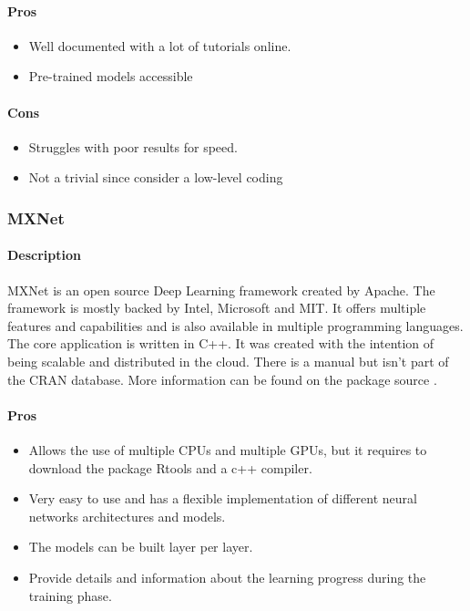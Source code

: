 \documentclass[letter,8pt]{article}\usepackage[]{graphicx}\usepackage[]{color}
\begin{document}
\paragraph{Pros}
\begin{itemize}
\item Well documented with a lot of tutorials online.
\item Pre-trained models accessible
\end{itemize}

\paragraph{Cons}
\begin{itemize}
\item Struggles with poor results for speed.
\item Not a trivial since consider a low-level coding
\end{itemize}


\subsubsection{MXNet}
\paragraph{Description}
MXNet is an open source Deep Learning framework created by Apache. The framework is mostly backed by Intel, Microsoft and MIT. It offers multiple features and capabilities and is also available in multiple programming languages. The core application is written in C++. It was created with the intention of being scalable and distributed in the cloud. There is a manual but isn't part of the CRAN database. More information can be found on the package source \cite{mxnet2020}.
\paragraph{Pros}
\begin{itemize}
\item Allows the use of multiple CPUs and multiple GPUs, but it requires to download the package Rtools and a c++ compiler.
\item Very easy to use and has a flexible implementation of different neural networks architectures and models.
\item The models can be built layer per layer.
\item Provide details and information about the learning progress during the training phase.
\end{itemize}
\end{document}
